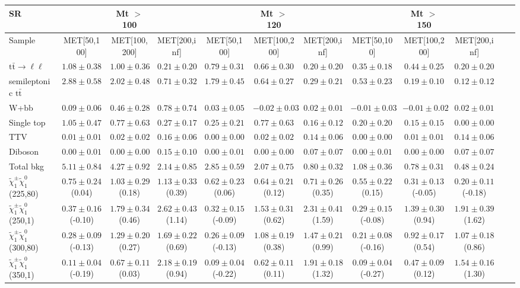 \begin{table}
\begin{center}
\small
\begin{tabular}{lccccccccccc}
\hline
SR & & Mt $>$ 100 & & & Mt $>$ 120 & & &Mt $>$ 150 & & &\\
\hline
Sample&MET[50,100]&MET[100,200]&MET[200,inf]&MET[50,100]&MET[100,200]&MET[200,inf]&MET[50,100]&MET[100,200]&MET[200,inf]&\\
\hline
$\mathrm{t}\bar{\mathrm{t}}\rightarrow \ell\ell$&$1.08\pm0.38$&$1.00\pm0.36$&$0.21\pm0.20$&$0.79\pm0.31$&$0.66\pm0.30$&$0.20\pm0.20$&$0.35\pm0.18$&$0.44\pm0.25$&$0.20\pm0.20$\\
semileptonic $\mathrm{t}\bar{\mathrm{t}}$&$2.88\pm0.58$&$2.02\pm0.48$&$0.71\pm0.32$&$1.79\pm0.45$&$0.64\pm0.27$&$0.29\pm0.21$&$0.53\pm0.23$&$0.19\pm0.10$&$0.12\pm0.12$\\
W+bb&$0.09\pm0.06$&$0.46\pm0.28$&$0.78\pm0.74$&$0.03\pm0.05$&$-0.02\pm0.03$&$0.02\pm0.01$&$-0.01\pm0.03$&$-0.01\pm0.02$&$0.02\pm0.01$\\
Single top&$1.05\pm0.47$&$0.77\pm0.63$&$0.27\pm0.17$&$0.25\pm0.21$&$0.77\pm0.63$&$0.16\pm0.12$&$0.20\pm0.20$&$0.15\pm0.15$&$0.00\pm0.00$\\
TTV&$0.01\pm0.01$&$0.02\pm0.02$&$0.16\pm0.06$&$0.00\pm0.00$&$0.02\pm0.02$&$0.14\pm0.06$&$0.00\pm0.00$&$0.01\pm0.01$&$0.14\pm0.06$\\
Diboson&$0.00\pm0.01$&$0.00\pm0.00$&$0.15\pm0.10$&$0.00\pm0.01$&$0.00\pm0.00$&$0.07\pm0.07$&$0.00\pm0.01$&$0.00\pm0.00$&$0.07\pm0.07$\\
\hline
Total bkg&$5.11\pm0.84$&$4.27\pm0.92$&$2.14\pm0.85$&$2.85\pm0.59$&$2.07\pm0.75$&$0.80\pm0.32$&$1.08\pm0.36$&$0.78\pm0.31$&$0.48\pm0.24$\\
$\tilde{\chi}_{1}^{\pm}\tilde{\chi}_{1}^{0}$ (225,80)&$0.75\pm0.24$(0.04)&$1.03\pm0.29$(0.18)&$1.13\pm0.33$(0.39)&$0.62\pm0.23$(0.06)&$0.64\pm0.21$(0.12)&$0.71\pm0.26$(0.35)&$0.55\pm0.22$(0.15)&$0.31\pm0.13$(-0.05)&$0.20\pm0.11$(-0.18)\\
$\tilde{\chi}_{1}^{\pm}\tilde{\chi}_{1}^{0}$ (250,1)&$0.37\pm0.16$(-0.10)&$1.79\pm0.34$(0.46)&$2.62\pm0.43$(1.14)&$0.32\pm0.15$(-0.09)&$1.53\pm0.31$(0.62)&$2.31\pm0.41$(1.59)&$0.29\pm0.15$(-0.08)&$1.39\pm0.30$(0.94)&$1.91\pm0.39$(1.62)\\
$\tilde{\chi}_{1}^{\pm}\tilde{\chi}_{1}^{0}$ (300,80)&$0.28\pm0.09$(-0.13)&$1.29\pm0.20$(0.27)&$1.69\pm0.22$(0.69)&$0.26\pm0.09$(-0.13)&$1.08\pm0.19$(0.38)&$1.47\pm0.21$(0.99)&$0.21\pm0.08$(-0.16)&$0.92\pm0.17$(0.54)&$1.07\pm0.18$(0.86)\\
$\tilde{\chi}_{1}^{\pm}\tilde{\chi}_{1}^{0}$ (350,1)&$0.11\pm0.04$(-0.19)&$0.67\pm0.11$(0.03)&$2.18\pm0.19$(0.94)&$0.09\pm0.04$(-0.22)&$0.62\pm0.11$(0.11)&$1.91\pm0.18$(1.32)&$0.09\pm0.04$(-0.27)&$0.47\pm0.09$(0.12)&$1.54\pm0.16$(1.30)\\
\hline
\hline\hline
\end{tabular}
\end{center}
\end{table}
